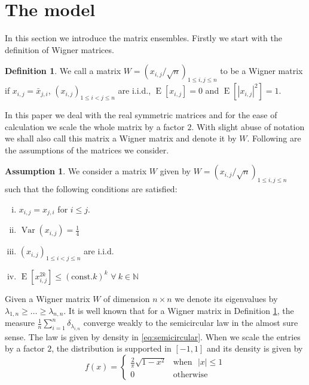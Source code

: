 \documentclass[12pt]{article}
\numberwithin{equation}{section}
\numberwithin{equation}{section}
\theoremstyle{definition}
\newtheorem{definition}{Definition}[section]
\newtheorem{assumption}{Assumption}[section]
\DeclareMathOperator{\E}{E} \DeclareMathOperator{\var}{Var}
\renewcommand{\1}{\bf 1}
\begin{document}
 \section{The model}
 In this section we introduce the matrix ensembles. Firstly we start with the definition of Wigner matrices. 
 \begin{definition}\label{def:wig}
 We call a matrix $W= \left( x_{i,j}/ \sqrt{n} \right)_{1\le i,j \le n}$ to be a Wigner matrix if $x_{i,j}=\bar{x}_{j,i}$, $\left(x_{i,j}\right)_{1\le i<j\le n}$ are i.i.d., $\E[x_{i,j}]=0$ and $\E[|x_{i,j}|^2]=1$. 
 \end{definition}
 In this paper we deal with the real symmetric matrices and for the ease of calculation we scale the whole matrix by a factor $2$. With slight abuse of notation we shall also call this matrix a Wigner matrix and denote it by $W$. Following are the assumptions of the matrices we consider.
 \begin{assumption}\label{ass:wig}
 We consider a matrix $W$ given by $W= (x_{i,j}/\sqrt{n})_{1\le i,j \le n}$ such that the following conditions are satisfied:
 \begin{enumerate}[(i)]
 \item $x_{i,j}=x_{j,i}$ for $i\le j$.
 \item $\var(x_{i,j})=\frac{1}{4}$
 \item $\left(x_{i,j}\right)_{1\le i<j \le n}$ are i.i.d.
 \item $\E[x_{i,j}^{2k}]\le \left( \mathrm{const} .k \right)^{k}$ $\forall ~ k \in \mathbb{N}$ 
 \end{enumerate}
 \end{assumption}
 Given a Wigner matrix $W$ of dimension $n \times n$ we denote its eigenvalues by $\lambda_{1,n}\ge \ldots \ge \lambda_{n,n}$. It is well known that for a Wigner matrix in Definition \ref{def:wig}, the measure $\frac{1}{n}\sum_{i=1}^{n} \delta_{\lambda_{i,n}}$ converge weakly to the semicircular law in the almost sure sense. The law is given by density in \eqref{eq:semicircular}. When we scale the entries by a factor $2$, the distribution is supported in $[-1,1]$ and its density is given by 
 \begin{equation}\label{eq:semicircularII}
 f(x)=\left\{
 \begin{array}{ll}
 \frac{2}{\pi} \sqrt{1-x^2} & \text{when~ $|x|\le 1$}\\
 0 & \text{otherwise} 
 \end{array}
 \right.
\end{equation}  
\end{document}

